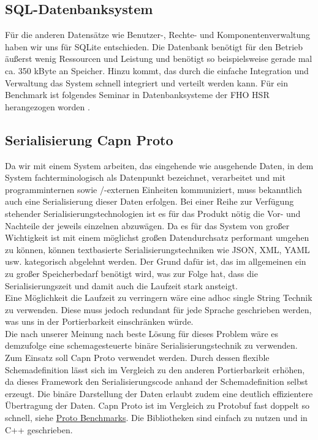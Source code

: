 \subsection{SQL-Datenbanksystem}
Für die anderen Datensätze wie Benutzer-, Rechte- und Komponentenverwaltung haben wir uns für SQLite entschieden. Die Datenbank benötigt für den Betrieb äußerst wenig Ressourcen und Leistung und benötigt so beispielsweise gerade mal ca. 350 kByte an Speicher. Hinzu kommt, das durch die einfache Integration und Verwaltung das System schnell integriert und verteilt werden kann. Für ein Benchmark ist folgendes Seminar in Datenbanksysteme der FHO HSR herangezogen worden \cite{MorierWeber2011}.
\subsection{Serialisierung Capn Proto}
Da wir mit einem System arbeiten, das eingehende wie ausgehende Daten, in dem System fachterminologisch als Datenpunkt bezeichnet, verarbeitet und mit programminternen sowie /-externen Einheiten kommuniziert, muss bekanntlich auch eine Serialisierung dieser Daten erfolgen.  Bei einer Reihe zur Verfügung stehender Serialisierungstechnologien ist es für das Produkt nötig die Vor- und Nachteile der jeweils einzelnen abzuwägen. Da es für das System von großer Wichtigkeit ist mit einem möglichst großen Datendurchsatz performant umgehen zu können, können textbasierte Serialisierungstechniken wie JSON, XML, YAML usw. kategorisch abgelehnt werden. Der Grund dafür ist, das im allgemeinen ein zu großer Speicherbedarf benötigt wird, was zur Folge hat, dass die Serialisierungszeit und damit auch die Laufzeit stark ansteigt.\\ 
Eine Möglichkeit die Laufzeit zu verringern wäre eine adhoc single String Technik zu verwenden. Diese muss jedoch redundant für jede Sprache geschrieben werden, was uns in der Portierbarkeit einschränken würde.\\
Die nach unserer Meinung nach beste Lösung für dieses Problem wäre es demzufolge eine schemagesteuerte binäre Serialisierungstechnik zu verwenden. Zum Einsatz soll Capn Proto verwendet werden. Durch dessen flexible Schemadefinition lässt sich im Vergleich zu den anderen Portierbarkeit erhöhen, da dieses Framework den Serialisierungscode anhand der Schemadefinition selbst erzeugt. Die binäre Darstellung der Daten erlaubt zudem eine deutlich effizientere Übertragung der Daten. Capn Proto ist im Vergleich zu Protobuf fast doppelt so schnell, siehe \href{https://github.com/ChrisMacNaughton/proto_benchmarks}{Proto Benchmarks}. Die Bibliotheken sind einfach zu nutzen und in C++ geschrieben.
